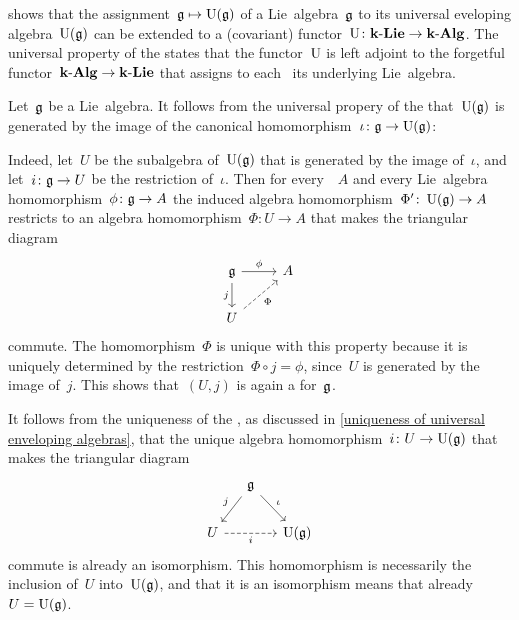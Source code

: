 \begin{remark}
   shows that the assignment~$\mathfrak{g} \mapsto \operatorname{U}(\mathfrak{g})$ of a Lie~algebra~$\mathfrak{g}$ to its universal eveloping algebra~$\operatorname{U}(\mathfrak{g})$ can be extended to a (covariant) functor~$\operatorname{U} \colon \mathbf{k}\text{-}\mathbf{Lie} \to \mathbf{k}\text{-}\mathbf{Alg}$.
  The universal property of the {\ua} states that the functor~$\operatorname{U}$ is left adjoint to the forgetful functor~$\mathbf{k}\text{-}\mathbf{Alg} \to \mathbf{k}\text{-}\mathbf{Lie}$ that assigns to each~{\algebra{$\kf$}} its underlying Lie~algebra.
\end{remark}


\begin{remark}
  Let~$\mathfrak{g}$ be a Lie~algebra.
  It follows from the universal propery of the {\ua} that~$\operatorname{U}(\mathfrak{g})$ is generated by the image of the canonical homomorphism~$\iota \colon \mathfrak{g} \to \operatorname{U}(\mathfrak{g})$:
  
  Indeed, let~$U$ be the subalgebra of~$\operatorname{U}(\mathfrak{g})$ that is generated by the image of~$\iota$, and let~$i \colon \mathfrak{g} \to U$ be the restriction of~$\iota$.
  Then for every~{\algebra{$\kf$}}~$A$ and every Lie~algebra homomorphism~$\phi \colon \mathfrak{g} \to A$ the induced algebra homomorphism~$\Phi' \colon \operatorname{U}(\mathfrak{g}) \to A$ restricts to an algebra homomorphism~$\Phi \colon U \to A$ that makes the triangular diagram
  \[
    \begin{tikzcd}
      \glie
      \arrow{r}[above]{\phi}
      \arrow{d}[left]{j}
      &
      A
      \\
      U
      \arrow[dashed]{ur}[below right]{\Phi}
      &
      {}
    \end{tikzcd}
  \]
  commute.
  The homomorphism~$\Phi$ is unique with this property because it is uniquely determined by the restriction~$\Phi \circ j = \phi$, since~$U$ is generated by the image of~$j$.
  This shows that~$(U, j)$ is again a {\ua} for~$\mathfrak{g}$.
  
  It follows from the uniqueness of the {\ua}, as discussed in \cref{uniqueness of universal enveloping algebras}, that the unique algebra homomorphism~$i \colon U \to \operatorname{U}(\mathfrak{g})$ that makes the triangular diagram
  \[
    \begin{tikzcd}[column sep = small]
      {}
      &
      \glie
      \arrow{dl}[above left]{j}
      \arrow{dr}[above right]{\iota}
      &
      {}
      \\
      U
      \arrow[dashed]{rr}[below]{i}
      &
      {}
      &
      \Univ(\glie)
    \end{tikzcd}
  \]
  commute is already an isomorphism.
  This homomorphism is necessarily the inclusion of~$U$ into~$\operatorname{U}(\mathfrak{g})$, and that it is an isomorphism means that already~$U = \operatorname{U}(\mathfrak{g})$.
  

\end{remark}

